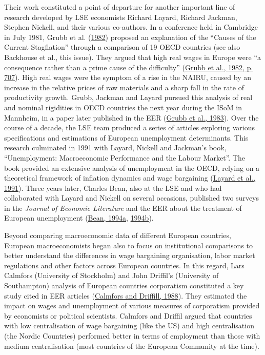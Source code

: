 \documentclass[
  12pt,
  onecolumn]{article}
\begin{document}
Their work constituted a point of departure for another important line of research developed by LSE economists Richard Layard, Richard Jackman, Stephen Nickell, and their various co-authors. In a conference held in Cambridge in July 1981, Grubb et al. (\protect\hyperlink{ref-grubb1982}{1982}) proposed an explanation of the ``Causes of the Current Stagflation'' through a comparison of 19 OECD countries (see also Backhouse et al., this issue). They argued that high real wages in Europe were ``a consequence rather than a prime cause of the difficulty'' (\protect\hyperlink{ref-grubb1982}{Grubb et al., 1982, p. 707}). High real wages were the symptom of a rise in the NAIRU, caused by an increase in the relative prices of raw materials and a sharp fall in the rate of productivity growth. Grubb, Jackman and Layard pursued this analysis of real and nominal rigidities in OECD countries the next year during the ISoM in Mannheim, in a paper later published in the EER (\protect\hyperlink{ref-grubb1983a}{Grubb et al., 1983}). Over the course of a decade, the LSE team produced a series of articles exploring various specifications and estimations of European unemployment determinants. This research culminated in 1991 with Layard, Nickell and Jackman's book, ``Unemployment: Macroeconomic Performance and the Labour Market''. The book provided an extensive analysis of unemployment in the OECD, relying on a theoretical framework of inflation dynamics and wage bargaining (\protect\hyperlink{ref-layard1991a}{Layard et al., 1991}). Three years later, Charles Bean, also at the LSE and who had collaborated with Layard and Nickell on several occasions, published two surveys in the \emph{Journal of Economic Literature} and the EER about the treatment of European unemployment (\protect\hyperlink{ref-bean1994}{Bean, 1994a}, \protect\hyperlink{ref-bean1994a}{1994b}).

Beyond comparing macroeconomic data of different European countries, European macroeconomists began also to focus on institutional comparisons to better understand the differences in wage bargaining organisation, labor market regulations and other factors across European countries. In this regard, Lars Calmfors (University of Stockholm) and John Driffil's (University of Southampton) analysis of European countries corporatism constituted a key study cited in EER articles (\protect\hyperlink{ref-calmfors1988}{Calmfors and Driffill, 1988}). They estimated the impact on wages and unemployment of various measures of corporatism provided by economists or political scientists. Calmfors and Driffil argued that countries with low centralisation of wage bargaining (like the US) and high centralisation (the Nordic Countries) performed better in terms of employment than those with medium centralisation (most countries of the European Community at the time).
\end{document}
